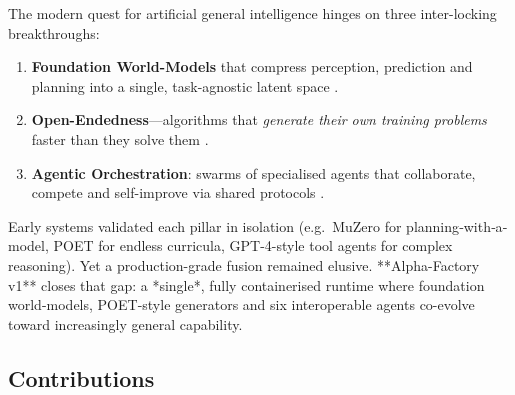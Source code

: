 The modern quest for artificial general intelligence hinges on three
inter-locking breakthroughs:

\begin{enumerate}[label=\textbf{P\arabic*}.]
  \item \textbf{Foundation World-Models} that compress perception, prediction
        and planning into a single, task-agnostic latent space
        \parencite{ha2018world,schrittwieser2019muzero,hafner2023dreamer}.
  \item \textbf{Open-Endedness}---algorithms that \emph{generate their own
        training problems} faster than they solve them
        \parencite{wang2019poet,clune2019aiga,ecoffet2021open}.
  \item \textbf{Agentic Orchestration}: swarms of specialised agents that
        collaborate, compete and self-improve via shared protocols
        \parencite{openaiagents2024,googleadk2024,a2a2023}.
\end{enumerate}

Early systems validated each pillar in isolation (e.g.\ MuZero for
planning‐with‐a‐model, POET for endless curricula, GPT-4-style tool agents for
complex reasoning).  Yet a production-grade fusion remained elusive.  
**Alpha-Factory v1** closes that gap: a *single*, fully containerised runtime
where foundation world-models, POET-style generators and six interoperable
agents co-evolve toward increasingly general capability.

\subsection{Contributions}

